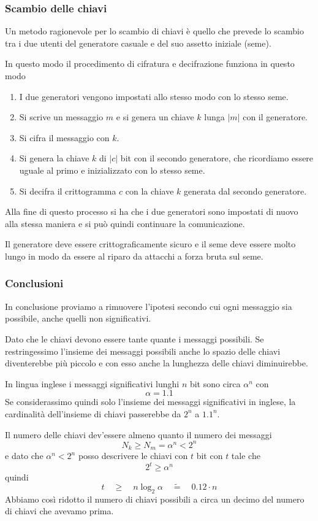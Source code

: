 \subsubsection{Scambio delle chiavi}
Un metodo ragionevole per lo scambio di chiavi \`e quello che prevede lo scambio tra i due utenti del generatore casuale
e del suo assetto iniziale (seme).

In questo modo il procedimento di cifratura e decifrazione funziona in questo modo
\begin{enumerate}
	\item I due generatori vengono impostati allo stesso modo con lo stesso seme.
	\item Si scrive un messaggio $m$ e si genera un chiave $k$ lunga $|m|$ con il generatore.
	\item Si cifra il messaggio con $k$.
	\item Si genera la chiave $k$ di $|c|$ bit con il secondo generatore, che ricordiamo essere uguale al primo e
	      inizializzato con lo stesso seme.
	\item Si decifra il crittogramma $c$ con la chiave $k$ generata dal secondo generatore.
\end{enumerate}
Alla fine di questo processo si ha che i due generatori sono impostati di nuovo alla stessa maniera e si pu\`o quindi
continuare la comunicazione.

Il generatore deve essere crittograficamente sicuro e il seme deve essere molto lungo in modo da essere al riparo da
attacchi a forza bruta sul seme.

\subsubsection{Conclusioni}
In conclusione proviamo a rimuovere l'ipotesi secondo cui ogni messaggio sia possibile, anche quelli non significativi.

Dato che le chiavi devono essere tante quante i messaggi possibili. Se restringessimo l'insieme dei messaggi possibili
anche lo spazio delle chiavi diventerebbe pi\`u piccolo e con esso anche la lunghezza delle chiavi diminuirebbe.

In lingua inglese i messaggi significativi lunghi $n$ bit sono circa $\alpha^n$ con
\[ \alpha = 1.1 \]
Se considerassimo quindi solo l'insieme dei messaggi significativi in inglese, la cardinalit\`a dell'insieme di chiavi
passerebbe da $2^n$ a $1.1^n$.

Il numero delle chiavi dev'essere almeno quanto il numero dei messaggi
\[ N_k \geq N_m = \alpha^n < 2^n \]
e dato che $\alpha^n < 2^n$ posso descrivere le chiavi con $t$ bit con $t$ tale che
\[ 2^t \geq \alpha^n \]
quindi
\[ t \quad \geq \quad n \log_2 \alpha \quad \tilde{=} \quad 0.12 \cdot n \]
Abbiamo cos\`i ridotto il numero di chiavi possibili a circa un decimo del numero di chiavi che avevamo prima.

